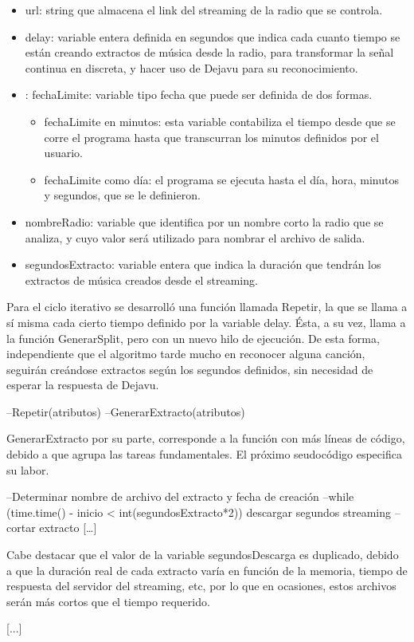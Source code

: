 \begin{itemize}
\item url: string que almacena el link del streaming de la radio que se controla.
\item delay: variable entera definida en segundos que indica cada cuanto tiempo se están creando extractos de música desde la radio, para transformar la señal continua en discreta, y hacer uso de Dejavu para su reconocimiento.

\item: fechaLimite: variable tipo fecha que puede ser definida de dos formas.

\begin{itemize}
\item fechaLimite en minutos: esta variable contabiliza el tiempo desde que se corre el programa hasta que transcurran los minutos definidos por el usuario.
\item fechaLimite como día: el programa se ejecuta hasta el día, hora, minutos y segundos, que se le definieron.
\end{itemize}

\item nombreRadio: variable que identifica por un nombre corto la radio que se analiza, y cuyo valor será utilizado para nombrar el archivo de salida.

\item segundosExtracto: variable entera que indica la duración que tendrán los extractos de música creados desde el streaming.

\end{itemize}

Para el ciclo iterativo se desarrolló una función llamada Repetir, la que se llama a sí misma cada cierto tiempo definido por la variable delay. Ésta, a su vez, llama a la función GenerarSplit, pero con un nuevo hilo de ejecución. De esta forma, independiente que el algoritmo tarde mucho en reconocer alguna canción, seguirán creándose extractos según los segundos definidos, sin necesidad de esperar la respuesta de Dejavu.

--Repetir(atributos)
--GenerarExtracto(atributos)

GenerarExtracto por su parte, corresponde a la función con más líneas de código, debido a que agrupa las tareas fundamentales. El próximo seudocódigo especifica su labor.

--Determinar nombre de archivo del extracto y fecha de creación
--while (time.time() - inicio < int(segundosExtracto*2))
	descargar segundos streaming
--cortar extracto 
[…]


Cabe destacar que el valor de la variable segundosDescarga es duplicado, debido a que la duración real de cada extracto varía en función de la memoria, tiempo de respuesta del servidor del streaming, etc, por lo que en ocasiones, estos archivos serán más cortos que el tiempo requerido.

[...]



